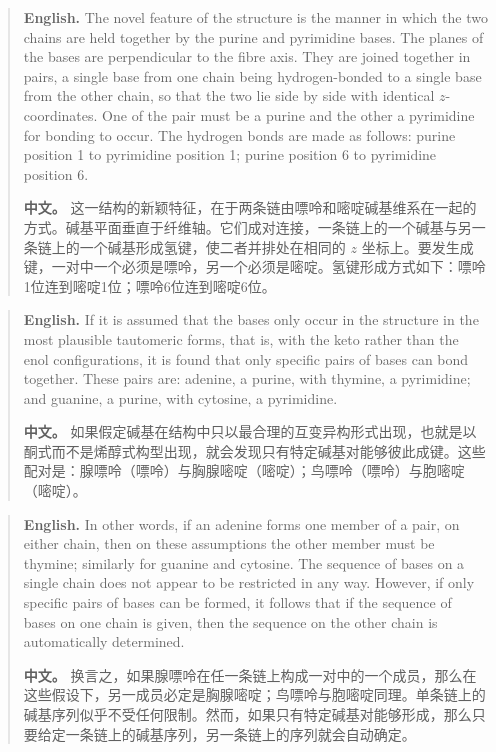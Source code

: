 \begin{quote}
\noindent\textbf{English.} The novel feature of the structure is the manner in which the two chains are held together by the purine and pyrimidine bases. The planes of the bases are perpendicular to the fibre axis. They are joined together in pairs, a single base from one chain being hydrogen-bonded to a single base from the other chain, so that the two lie side by side with identical \(z\)-coordinates. One of the pair must be a purine and the other a pyrimidine for bonding to occur. The hydrogen bonds are made as follows: purine position 1 to pyrimidine position 1; purine position 6 to pyrimidine position 6.

\smallskip
\noindent\textbf{中文。} 这一结构的新颖特征，在于两条链由嘌呤和嘧啶碱基维系在一起的方式。碱基平面垂直于纤维轴。它们成对连接，一条链上的一个碱基与另一条链上的一个碱基形成氢键，使二者并排处在相同的 \(z\) 坐标上。要发生成键，一对中一个必须是嘌呤，另一个必须是嘧啶。氢键形成方式如下：嘌呤1位连到嘧啶1位；嘌呤6位连到嘧啶6位。
\end{quote}

\begin{quote}
\noindent\textbf{English.} If it is assumed that the bases only occur in the structure in the most plausible tautomeric forms, that is, with the keto rather than the enol configurations, it is found that only specific pairs of bases can bond together. These pairs are: adenine, a purine, with thymine, a pyrimidine; and guanine, a purine, with cytosine, a pyrimidine.

\smallskip
\noindent\textbf{中文。} 如果假定碱基在结构中只以最合理的互变异构形式出现，也就是以酮式而不是烯醇式构型出现，就会发现只有特定碱基对能够彼此成键。这些配对是：腺嘌呤（嘌呤）与胸腺嘧啶（嘧啶）；鸟嘌呤（嘌呤）与胞嘧啶（嘧啶）。
\end{quote}

\begin{quote}
\noindent\textbf{English.} In other words, if an adenine forms one member of a pair, on either chain, then on these assumptions the other member must be thymine; similarly for guanine and cytosine. The sequence of bases on a single chain does not appear to be restricted in any way. However, if only specific pairs of bases can be formed, it follows that if the sequence of bases on one chain is given, then the sequence on the other chain is automatically determined.

\smallskip
\noindent\textbf{中文。} 换言之，如果腺嘌呤在任一条链上构成一对中的一个成员，那么在这些假设下，另一成员必定是胸腺嘧啶；鸟嘌呤与胞嘧啶同理。单条链上的碱基序列似乎不受任何限制。然而，如果只有特定碱基对能够形成，那么只要给定一条链上的碱基序列，另一条链上的序列就会自动确定。
\end{quote}

